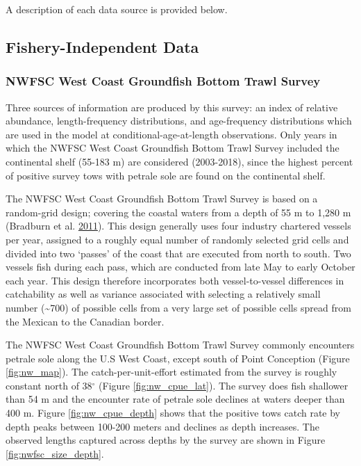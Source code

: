 \documentclass[12pt,]{article}
\begin{document}
A description of each data source is provided below.

\subsection{Fishery-Independent Data}\label{fishery-independent-data}

\hypertarget{nwfsc_survey}{\subsubsection{NWFSC West Coast Groundfish
Bottom Trawl Survey}\label{nwfsc_survey}}

Three sources of information are produced by this survey: an index of
relative abundance, length-frequency distributions, and age-frequency
distributions which are used in the model at conditional-age-at-length
observations. Only years in which the NWFSC West Coast Groundfish Bottom
Trawl Survey included the continental shelf (55-183 m) are considered
(2003-2018), since the highest percent of positive survey tows with
petrale sole are found on the continental shelf.

The NWFSC West Coast Groundfish Bottom Trawl Survey is based on a
random-grid design; covering the coastal waters from a depth of 55 m to
1,280 m (Bradburn et al.
\protect\hyperlink{ref-bradburn_2003_2011}{2011}). This design generally
uses four industry chartered vessels per year, assigned to a roughly
equal number of randomly selected grid cells and divided into two
`passes' of the coast that are executed from north to south. Two vessels
fish during each pass, which are conducted from late May to early
October each year. This design therefore incorporates both
vessel-to-vessel differences in catchability as well as variance
associated with selecting a relatively small number
(\textasciitilde{}700) of possible cells from a very large set of
possible cells spread from the Mexican to the Canadian border.

The NWFSC West Coast Groundfish Bottom Trawl Survey commonly encounters
petrale sole along the U.S West Coast, except south of Point Conception
(Figure \ref{fig:nw_map}). The catch-per-unit-effort estimated from the
survey is roughly constant north of 38\(^\circ\) (Figure
\ref{fig:nw_cpue_lat}). The survey does fish shallower than 54 m and the
encounter rate of petrale sole declines at waters deeper than 400 m.
Figure \ref{fig:nw_cpue_depth} shows that the positive tows catch rate
by depth peaks between 100-200 meters and declines as depth increases.
The observed lengths captured across depths by the survey are shown in
Figure \ref{fig:nwfsc_size_depth}.
\end{document}
